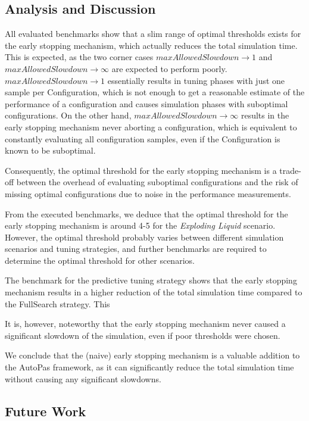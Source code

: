 \documentclass[conference]{IEEEtran}
\begin{document}
\subsection{Analysis and Discussion}

All evaluated benchmarks show that a slim range of optimal thresholds exists for the early stopping mechanism, which actually reduces the total simulation time. This is expected, as the two corner cases $maxAllowedSlowdown \to 1$ and $maxAllowedSlowdown \to \infty$ are expected to perform poorly. $maxAllowedSlowdown \to 1$ essentially results in tuning phases with just one sample per Configuration, which is not enough to get a reasonable estimate of the performance of a configuration and causes simulation phases with suboptimal configurations. On the other hand, $maxAllowedSlowdown \to \infty$ results in the early stopping mechanism never aborting a configuration, which is equivalent to constantly evaluating all configuration samples, even if the Configuration is known to be suboptimal.

Consequently, the optimal threshold for the early stopping mechanism is a trade-off between the overhead of evaluating suboptimal configurations and the risk of missing optimal configurations due to noise in the performance measurements.

From the executed benchmarks, we deduce that the optimal threshold for the early stopping mechanism is around 4-5 for the \textit{Exploding Liquid} scenario. However, the optimal threshold probably varies between different simulation scenarios and tuning strategies, and further benchmarks are required to determine the optimal threshold for other scenarios.

The benchmark for the predictive tuning strategy shows that the early stopping mechanism results in a higher reduction of the total simulation time compared to the FullSearch strategy. This

It is, however, noteworthy that the early stopping mechanism never caused a significant slowdown of the simulation, even if poor thresholds were chosen.

We conclude that the (naive) early stopping mechanism is a valuable addition to the AutoPas framework, as it can significantly reduce the total simulation time without causing any significant slowdowns.

\subsection{Future Work}
\end{document}
